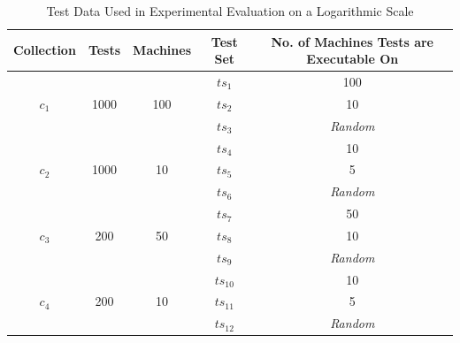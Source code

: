 \begin{landscape}
    \thispagestyle{plain}
    \vspace*{\fill}
    \begin{table}[h]
      \begin{tabular}{|c|c|c|c|c|}
        \hline
        \textbf{Collection} & \textbf{Tests} & \textbf{Machines} & \textbf{Test Set} & \textbf{No. of Machines Tests are Executable On}\\
        \hline
        \multirow{3}{*}{$c_1$} & \multirow{3}{*}{1000} & \multirow{3}{*}{100} & $ts_{1}$  & 100\\
                               &                       &                      & $ts_{2}$  & 10\\
                               &                       &                      & $ts_{3}$  & \emph{Random}\\
        \hline
        \multirow{3}{*}{$c_2$} & \multirow{3}{*}{1000} & \multirow{3}{*}{10}  & $ts_{4}$  & 10\\
                               &                       &                      & $ts_{5}$  & 5\\
                               &                       &                      & $ts_{6}$  & \emph{Random}\\
        \hline
        \multirow{3}{*}{$c_3$} & \multirow{3}{*}{200} & \multirow{3}{*}{50}   & $ts_{7}$  & 50\\
                               &                      &                       & $ts_{8}$  & 10\\
                               &                      &                       & $ts_{9}$  & \emph{Random}\\
        \hline
        \multirow{3}{*}{$c_4$} & \multirow{3}{*}{200} & \multirow{3}{*}{10}   & $ts_{10}$ & 10\\
                               &                      &                       & $ts_{11}$ & 5\\
                               &                      &                       & $ts_{12}$ & \emph{Random}\\
        \hline
      \end{tabular}
      \centering
      \caption{Test Data Used in Experimental Evaluation on a Logarithmic Scale}
      \label{test_data}
    \end{table}
    \vspace*{\fill}
\end{landscape}

